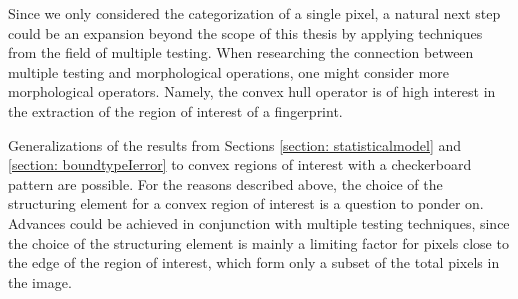 \documentclass[a4paper,12pt]{article}
\theoremstyle{plain}
\theoremstyle{definition}
\begin{document}
Since we only considered the categorization of a single pixel, a natural next step could be an expansion beyond the scope of this thesis by applying techniques from the field of multiple testing. When researching the connection between multiple testing and morphological operations, one might consider more morphological operators. Namely, the convex hull operator is of high interest in the extraction of the region of interest of a fingerprint.

Generalizations of the results from Sections \ref{section: statisticalmodel} and \ref{section: boundtypeIerror} to convex regions of interest with a checkerboard pattern are possible. For the reasons described above, the choice of the structuring element for a convex region of interest is a question to ponder on. Advances could be achieved in conjunction with multiple testing techniques, since the choice of the structuring element is mainly a limiting factor for pixels close to the edge of the region of interest, which form only a subset of the total pixels in the image.

\newpage
\end{document}
